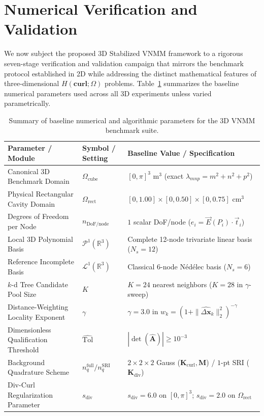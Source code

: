 \documentclass[preprint,12pt]{elsarticle}
\newcommand{\R}{\mathbb{R}}
\newcommand{\Hcurl}{H(\mathbf{curl};\Omega)}
\begin{document}
\section{Numerical Verification and Validation}
\label{sec:results}

We now subject the proposed 3D Stabilized VNMM framework to a rigorous seven-stage verification and validation campaign that mirrors the benchmark protocol established in 2D \cite{Mesquita2026VNMM2D} while addressing the distinct mathematical features of three-dimensional $\Hcurl$ problems. Table~\ref{tab:baseline_params_3d} summarizes the baseline numerical parameters used across all 3D experiments unless varied parametrically.

\begin{table}[htbp]
\centering
\caption{Summary of baseline numerical and algorithmic parameters for the 3D VNMM benchmark suite.}
\label{tab:baseline_params_3d}
\footnotesize
\begin{tabular}{lll}
\toprule
\textbf{Parameter / Module} & \textbf{Symbol / Setting} & \textbf{Baseline Value / Specification} \\
\midrule
Canonical 3D Benchmark Domain & $\Omega_{\text{cube}}$ & $[0, \pi]^3\text{ m}^3$ (exact $\lambda_{mnp} = m^2 + n^2 + p^2$) \\
Physical Rectangular Cavity Domain & $\Omega_{\text{rect}}$ & $[0, 1.00] \times [0, 0.50] \times [0, 0.75]\text{ cm}^3$ \\
Degrees of Freedom per Node & $n_{\text{DoF/node}}$ & $1$ scalar DoF/node ($e_i = \vec{E}(P_i)\cdot\vec{t}_i$) \\
Local 3D Polynomial Basis & $\mathcal{P}^1(\R^3)$ & Complete 12-node trivariate linear basis ($N_s = 12$) \\
Reference Incomplete Basis & $\mathcal{L}^1(\R^3)$ & Classical 6-node N\'{e}d\'{e}lec basis ($N_s = 6$) \\
$k$-d Tree Candidate Pool Size & $K$ & $K = 24$ nearest neighbors ($K=28$ in $\gamma$-sweep) \\
Distance-Weighting Locality Exponent & $\gamma$ & $\gamma = 3.0$ in $w_k = (1 + \|\widehat{\Delta\mathbf{x}}_k\|_2^2)^{-\gamma}$ \\
Dimensionless Qualification Threshold & $\widehat{\text{Tol}}$ & $|\det(\widehat{\mathbf{A}})| \ge 10^{-3}$ \\
Background Quadrature Scheme & $n_q^{\text{full}} / n_q^{\text{SRI}}$ & $2\times 2\times 2$ Gauss ($\mathbf{K}_{\text{curl}}, \mathbf{M}$) / $1$-pt SRI ($\mathbf{K}_{\text{div}}$) \\
Div-Curl Regularization Parameter & $s_{\text{div}}$ & $s_{\text{div}} = 6.0$ on $[0,\pi]^3$; $s_{\text{div}} = 2.0$ on $\Omega_{\text{rect}}$ \\
\bottomrule
\end{tabular}
\end{table}
\end{document}
